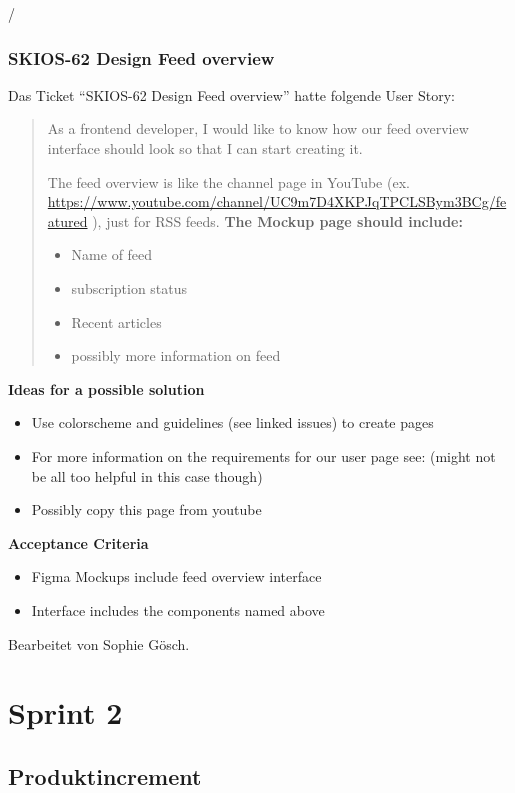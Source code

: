 /\subsubsection{SKIOS-62 Design Feed overview}
Das Ticket \enquote{SKIOS-62 Design Feed overview} hatte folgende User Story:
\begin{quotation}
    As a frontend developer, I would like to know how our feed overview interface should look so that I can start creating it.

    The feed overview is like the channel page in YouTube (ex. \url{https://www.youtube.com/channel/UC9m7D4XKPJqTPCLSBym3BCg/featured} ), just for RSS feeds.
    \textbf{The Mockup page should include:}
        \begin{itemize}
            \item Name of feed
            \item subscription status
            \item Recent articles
            \item possibly more information on feed
        \end{itemize}
\end{quotation}
\textbf{Ideas for a possible solution}
    \begin{itemize}
        \item Use colorscheme and guidelines (see linked issues) to create pages
        \item For more information on the requirements for our user page see:  (might not be all too helpful in this case though)
        \item Possibly copy this page from youtube
    \end{itemize}
\textbf{Acceptance Criteria}
    \begin{itemize}
        \item Figma Mockups include feed overview interface
        \item Interface includes the components named above
    \end{itemize}
Bearbeitet von Sophie Gösch.

\section{Sprint 2}
\subsection{Produktincrement}
